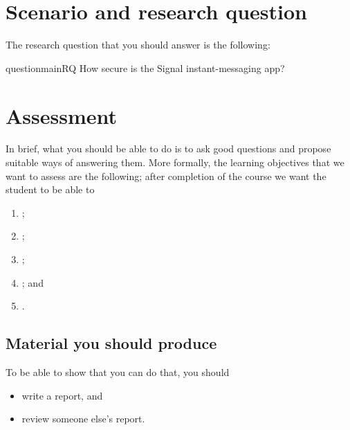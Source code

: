 \section{Scenario and research question}

The research question that you should answer is the following:
\begin{frame}
\begin{restatable}{question}{mainRQ}\label{mainRQ}
  How secure is the Signal instant-messaging app?
\end{restatable}
\end{frame}

\section<article>{Assessment}\label{Assessment}

In brief, what you should be able to do is to ask good questions and propose 
suitable ways of answering them.
More formally, the learning objectives that we want to assess are the 
following; after completion of the course we want the student to be able to
\begin{enumerate}[label={(LO\arabic*)},ref=LO\arabic*]
  \item \LOrelate*;
  \item \LOevaluate*;
  \item \LOapply*;
  \item \LOplan*; and
  \item \LOcomm*.
\end{enumerate}

\subsection{Material you should produce}

To be able to show that you can do that, you should
\begin{frame}
\begin{itemize}
  \item write a report, and
  \item review someone else's report.
\end{itemize}
\end{frame}

